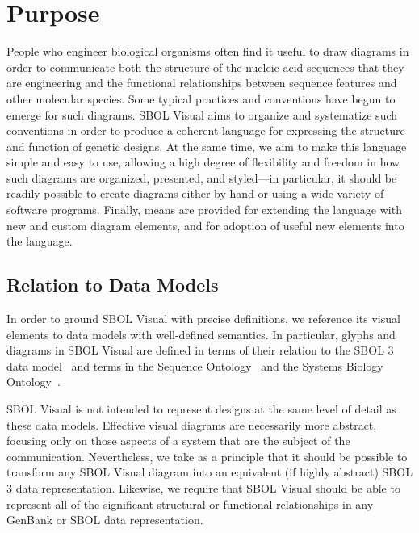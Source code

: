 \section{Purpose}

People who engineer biological organisms often find it useful to draw diagrams in order to
communicate both the structure of the nucleic acid sequences that they are engineering
and the functional relationships between sequence features and other molecular species.
%
Some typical practices and conventions have begun to emerge for such
diagrams.  SBOL Visual aims to organize and systematize such
conventions in order to produce a coherent language for expressing
the structure and function 
of genetic designs. 
%
At the same time, we aim to make this language simple and easy to use,
allowing a high degree of flexibility and freedom in how such diagrams are organized, presented, and
styled---in particular, it should be readily possible to create
diagrams either by hand or using a wide variety of software programs.
%
Finally, means are provided for extending the language with new and
custom diagram elements, and for adoption of useful new elements into
the language.

\subsection{Relation to Data Models}

In order to ground SBOL Visual with precise definitions, we reference its visual elements to data models with well-defined semantics.
In particular, glyphs and diagrams in SBOL Visual are defined in terms of their relation to the SBOL 3 data model~\citep{SBOL3_0} and terms in the Sequence Ontology~\citep{SequenceOntology} and
the Systems Biology Ontology~\citep{SBO}.

SBOL Visual is not intended to represent designs at the same level of detail as these data models.
Effective visual diagrams are necessarily more abstract, focusing only on those aspects of a system that are the subject of the communication.
Nevertheless, we take as a principle that it should be possible to transform any SBOL Visual diagram into an equivalent (if highly abstract) SBOL 3 data representation.
Likewise, we require that SBOL Visual should be able to represent all of the significant structural or functional relationships in any GenBank or SBOL data representation.
